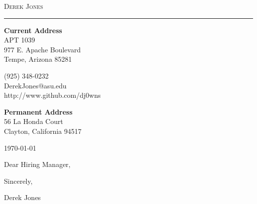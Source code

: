 \documentclass[10pt,oneside]{article}
\makeatletter
\newcommand{\name}{Derek Jones}
\newcommand{\homeaddrtop}{56 La Honda Court}
\newcommand{\homeaddrbot}{Clayton, California 94517}
\newcommand{\schooladdrtop}{APT 1039}
\newcommand{\schooladdrmid}{977 E. Apache Boulevard}
\newcommand{\schooladdrbot}{Tempe, Arizona 85281}
\newcommand{\cellphone}{(925) 348-0232}
\newcommand{\email}{DerekJones@asu.edu}
\newcommand{\github}{http://www.github.com/dj0wns}
\newcommand{\bigname}[1]{
	\begin{center}\huge\scshape#1\end{center}
}
\makeatother
\begin{document}
 \selectfont

\bigname{\name}
\vspace{-6pt} \rule{\textwidth}{1pt}
\vspace{-22pt}
\begin{multicols}{3}
	
	{\bfseries Current Address}\\
	\schooladdrtop \\
	\schooladdrmid \\
	\schooladdrbot \\
	
	\columnbreak
	\begin{center}
		\cellphone \\
		\email\\
		\github\\
	\end{center}
	
	\columnbreak
	\begin{flushright}
	{\bfseries Permanent Address}\\
	\homeaddrtop\\
	\homeaddrbot\\
	\end{flushright}

\end{multicols}

\vspace{-24 pt}

\vspace{\baselineskip}
\vspace{\baselineskip}
\vspace{\baselineskip}
\vspace{\baselineskip}

\large \today

\vspace{\baselineskip}
\vspace{\baselineskip}

\large Dear Hiring Manager,

\vspace{\baselineskip}
\vspace{\baselineskip}



\vspace{\baselineskip}



\vspace{\baselineskip}



\vspace{\baselineskip}



\vspace{\baselineskip}
\vspace{\baselineskip}

Sincerely,

\vspace{\baselineskip}

Derek Jones
\end{document}
